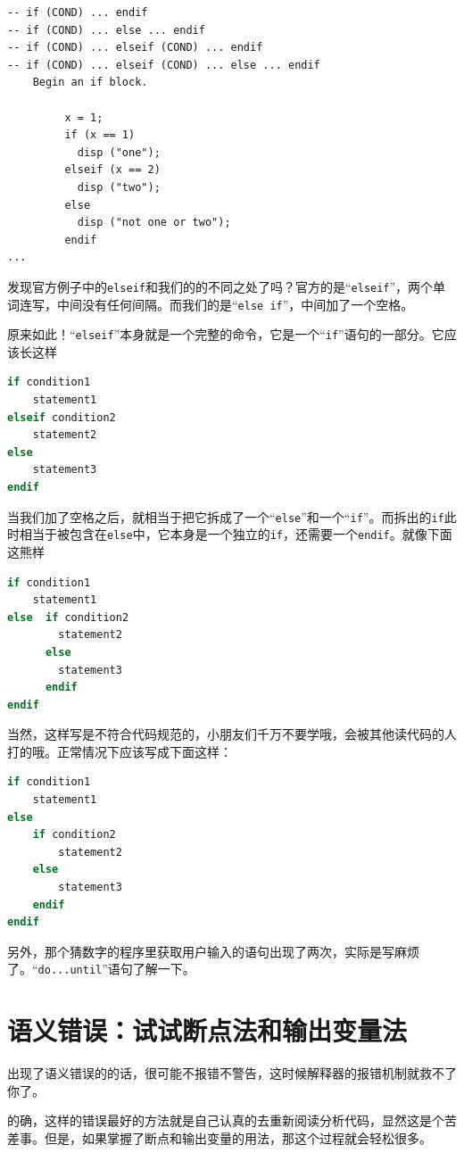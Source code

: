 \documentclass[12pt]{article}
\begin{document}
\begin{spacing}{1.4}
\begin{lstlisting}
-- if (COND) ... endif
-- if (COND) ... else ... endif
-- if (COND) ... elseif (COND) ... endif
-- if (COND) ... elseif (COND) ... else ... endif
    Begin an if block.

         x = 1;
         if (x == 1)
           disp ("one");
         elseif (x == 2)
           disp ("two");
         else
           disp ("not one or two");
         endif
...
\end{lstlisting}

发现官方例子中的\texttt{elseif}和我们的的不同之处了吗？官方的是“\texttt{elseif}”，两个单词连写，中间没有任何间隔。而我们的是“\texttt{else if}”，中间加了一个空格。

原来如此！“\texttt{elseif}”本身就是一个完整的命令，它是一个“\texttt{if}”语句的一部分。它应该长这样

\begin{lstlisting}[language=octave]
if condition1
    statement1
elseif condition2
    statement2
else
    statement3
endif
\end{lstlisting}

当我们加了空格之后，就相当于把它拆成了一个“\texttt{else}”和一个“\texttt{if}”。而拆出的\texttt{if}此时相当于被包含在\texttt{else}中，它本身是一个独立的\texttt{if}，还需要一个\texttt{endif}。就像下面这熊样

\begin{lstlisting}[language=octave]
if condition1
    statement1
else  if condition2
        statement2
      else 
        statement3
      endif
endif
\end{lstlisting}

当然，这样写是不符合代码规范的，小朋友们千万不要学哦，会被其他读代码的人打的哦。正常情况下应该写成下面这样：

\begin{lstlisting}[language=octave]
if condition1
    statement1
else
    if condition2
        statement2
    else 
        statement3
    endif
endif
\end{lstlisting}

另外，那个猜数字的程序里获取用户输入的语句出现了两次，实际是写麻烦了。“\texttt{do...until}”语句了解一下。

\section{语义错误：试试断点法和输出变量法}

出现了语义错误的的话，很可能不报错不警告，这时候解释器的报错机制就救不了你了。

的确，这样的错误最好的方法就是自己认真的去重新阅读分析代码，显然这是个苦差事。但是，如果掌握了断点和输出变量的用法，那这个过程就会轻松很多。


\end{spacing}
\end{document}
